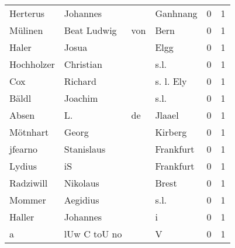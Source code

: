 \begin{tabular}{llllrr}
                 Herterus &                           Johannes &             &                                    Ganhnang &          0 &         1 \\
                  Mülinen &                        Beat Ludwig &         von &                                        Bern &          0 &         1 \\
                    Haler &                              Josua &             &                                        Elgg &          0 &         1 \\
               Hochholzer &                          Christian &             &                                        s.l. &          0 &         1 \\
                      Cox &                            Richard &             &                                   s. l. Ely &          0 &         1 \\
                    Bäldl &                            Joachim &             &                                        s.l. &          0 &         1 \\
                    Absen &                                 L. &          de &                                      Jlaael &          0 &         1 \\
                 Mötnhart &                              Georg &             &                                     Kirberg &          0 &         1 \\
                  jfearno &                         Stanislaus &             &                                   Frankfurt &          0 &         1 \\
                   Lydius &                                 iS &             &                                   Frankfurt &          0 &         1 \\
                Radziwill &                           Nikolaus &             &                                       Brest &          0 &         1 \\
                   Mommer &                           Aegidius &             &                                        s.l. &          0 &         1 \\
                   Haller &                           Johannes &             &                                           i &          0 &         1 \\
                        a &                       lUw C toU no &             &                                           V &          0 &         1 \\

\end{tabular}
